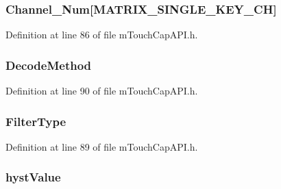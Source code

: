 \subsubsection[{Channel\+\_\+\+Num}]{ Channel\+\_\+\+Num\mbox{[}{\bf M\+A\+T\+R\+I\+X\+\_\+\+S\+I\+N\+G\+L\+E\+\_\+\+K\+E\+Y\+\_\+\+C\+H}\mbox{]}}\label{struct_m_a_t_r_i_x_k_e_y_ab09f1f6c37206f56faaead3beee6c4d7}


Definition at line 86 of file m\+Touch\+Cap\+A\+P\+I.\+h.

\hypertarget{struct_m_a_t_r_i_x_k_e_y_a3ec50eb50f016432fd63460deb50d4d3}{}
\subsubsection[{Decode\+Method}]{ Decode\+Method}\label{struct_m_a_t_r_i_x_k_e_y_a3ec50eb50f016432fd63460deb50d4d3}


Definition at line 90 of file m\+Touch\+Cap\+A\+P\+I.\+h.

\hypertarget{struct_m_a_t_r_i_x_k_e_y_a3ed3b2bb276c531333666858f705a254}{}
\subsubsection[{Filter\+Type}]{ Filter\+Type}\label{struct_m_a_t_r_i_x_k_e_y_a3ed3b2bb276c531333666858f705a254}


Definition at line 89 of file m\+Touch\+Cap\+A\+P\+I.\+h.

\hypertarget{struct_m_a_t_r_i_x_k_e_y_aee26e696540c8197e148cb9f0ccd4551}{}
\subsubsection[{hyst\+Value}]{ hyst\+Value}\label{struct_m_a_t_r_i_x_k_e_y_aee26e696540c8197e148cb9f0ccd4551}


